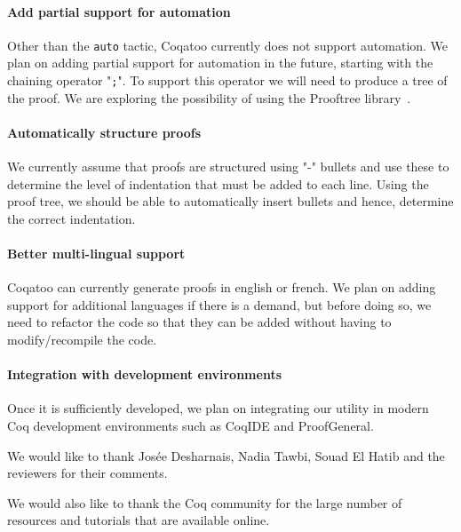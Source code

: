 \documentclass[sigplan,9pt]{acmart}\settopmatter{printfolios=true,printccs=false,printacmref=false}
\begin{document}
\paragraph{Add partial support for automation}
Other than the \lstinline{auto} tactic, Coqatoo currently does not support automation. We plan on adding partial support for automation in the future, starting with the chaining operator "\lstinline{;}". To support this operator we will need to produce a tree of the proof. We are exploring the possibility of using the Prooftree library~\cite{Prooftree}.


\paragraph{Automatically structure proofs}
We currently assume that proofs are structured using "-" bullets and use these to determine the level of indentation that must be added to each line. Using the proof tree, we should be able to automatically insert bullets and hence, determine the correct indentation.

\paragraph{Better multi-lingual support}
Coqatoo can currently generate proofs in english or french. We plan on adding support for additional languages if there is a demand, but before doing so, we need to refactor the code so that they can be added without having to modify/recompile the code.

\paragraph{Integration with development environments} Once it is sufficiently developed, we plan on integrating our utility in modern Coq development environments such as CoqIDE and ProofGeneral.

\newpage

\begin{acks}
  We would like to thank Josée Desharnais, Nadia Tawbi, Souad El Hatib and the reviewers for their comments.

  We would also like to thank the Coq community for the large number of resources and tutorials that are available online.
\end{acks}


\end{document}
